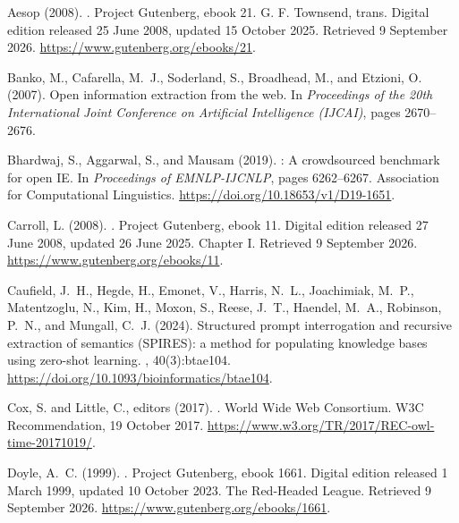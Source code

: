 \documentclass[a4paper,twoside]{article}
\begin{document}
{\small\begin{thebibliography}{}

{Aesop} (2008).
.
\newblock Project Gutenberg, ebook 21.
\newblock G. F. Townsend, trans. Digital edition released 25 June 2008, updated
  15 October 2025. Retrieved 9 September 2026.
  \url{https://www.gutenberg.org/ebooks/21}.

Banko, M., Cafarella, M.~J., Soderland, S., Broadhead, M., and Etzioni, O.
  (2007).
\newblock Open information extraction from the web.
\newblock In {\em Proceedings of the 20th International Joint Conference on
  Artificial Intelligence (IJCAI)}, pages 2670--2676.

Bhardwaj, S., Aggarwal, S., and {Mausam} (2019).
: A crowdsourced benchmark for open {IE}.
\newblock In {\em Proceedings of {EMNLP-IJCNLP}}, pages 6262--6267. Association
  for Computational Linguistics.
\newblock \url{https://doi.org/10.18653/v1/D19-1651}.

Carroll, L. (2008).
.
\newblock Project Gutenberg, ebook 11.
\newblock Digital edition released 27 June 2008, updated 26 June 2025. Chapter
  I. Retrieved 9 September 2026. \url{https://www.gutenberg.org/ebooks/11}.

Caufield, J.~H., Hegde, H., Emonet, V., Harris, N.~L., Joachimiak, M.~P.,
  Matentzoglu, N., Kim, H., Moxon, S., Reese, J.~T., Haendel, M.~A., Robinson,
  P.~N., and Mungall, C.~J. (2024).
\newblock Structured prompt interrogation and recursive extraction of semantics
  ({SPIRES}): a method for populating knowledge bases using zero-shot learning.
, 40(3):btae104.
\newblock \url{https://doi.org/10.1093/bioinformatics/btae104}.

Cox, S. and Little, C., editors (2017).
.
\newblock World Wide Web Consortium.
\newblock W3C Recommendation, 19 October 2017.
  \url{https://www.w3.org/TR/2017/REC-owl-time-20171019/}.

Doyle, A.~C. (1999).
.
\newblock Project Gutenberg, ebook 1661.
\newblock Digital edition released 1 March 1999, updated 10 October 2023. The
  Red-Headed League. Retrieved 9 September 2026.
  \url{https://www.gutenberg.org/ebooks/1661}.


\end{thebibliography}}
\end{document}
